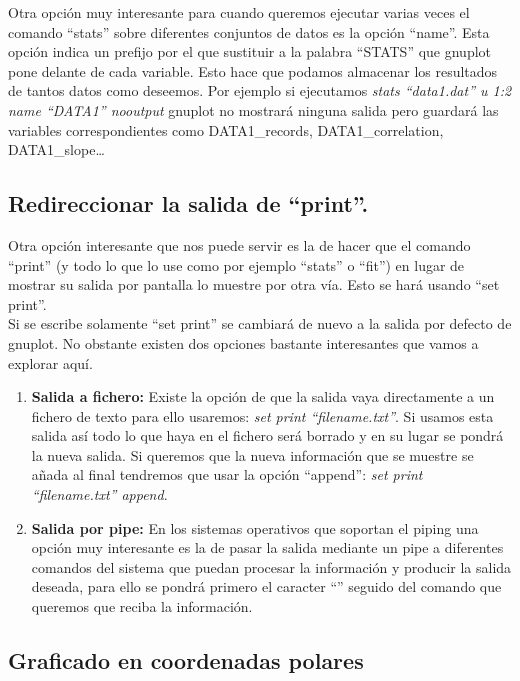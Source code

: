 \documentclass[11pt,a4paper,twoside,pdf]{article}
\numberwithin{equation}{section}
\begin{document}
Otra opción muy interesante para cuando queremos ejecutar varias veces el comando ``stats'' sobre diferentes conjuntos de datos es la opción ``name''. Esta opción indica un prefijo por el que sustituir a la palabra ``STATS'' que gnuplot pone delante de cada variable. Esto hace que podamos almacenar los resultados de tantos datos como deseemos. Por ejemplo si ejecutamos \textit{stats ``data1.dat'' u 1:2 name ``DATA1'' nooutput} gnuplot no mostrará ninguna salida pero guardará las variables correspondientes como DATA1\_records, DATA1\_correlation, DATA1\_slope\ldots

\subsection{Redireccionar la salida de ``print''.}

Otra opción interesante que nos puede servir es la de hacer que el comando ``print'' (y todo lo que lo use como por ejemplo ``stats'' o ``fit'') en lugar de mostrar su salida por pantalla lo muestre por otra vía. Esto se hará usando ``set print''. \\

Si se escribe solamente ``set print'' se cambiará de nuevo a la salida por defecto de gnuplot. No obstante existen dos opciones bastante interesantes que vamos a explorar aquí.

\begin{enumerate}
	\item \textbf{Salida a fichero:} Existe la opción de que la salida vaya directamente a un fichero de texto para ello usaremos: \textit{set print ``filename.txt''}. Si usamos esta salida así todo lo que haya en el fichero será borrado y en su lugar se pondrá la nueva salida. Si queremos que la nueva información que se muestre se añada al final tendremos que usar la opción ``append'': \textit{set print ``filename.txt'' append}.
	\item \textbf{Salida por pipe:} En los sistemas operativos que soportan el piping una opción muy interesante es la de pasar la salida mediante un pipe a diferentes comandos del sistema que puedan procesar la información y producir la salida deseada, para ello se pondrá primero el caracter ``\textbar'' seguido del comando que queremos que reciba la información.
\end{enumerate}

\subsection{Graficado en coordenadas polares}
\end{document}
